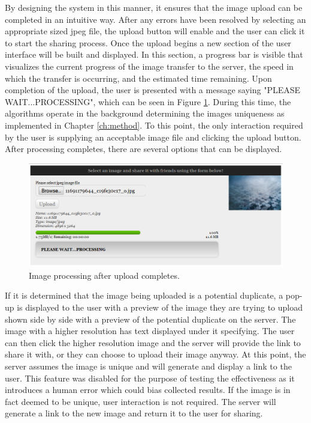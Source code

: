 By designing the system in this manner, it ensures that the image upload can be completed in an intuitive way. After any errors have been resolved by selecting an appropriate sized jpeg file, the upload button will enable and the user can click it to start the sharing process. Once the upload begins a new section of the user interface will be built and displayed. In this section, a progress bar is visible that visualizes the current progress of the image transfer to the server, the speed in which the transfer is occurring, and the estimated time remaining. Upon completion of the upload, the user is presented with a message saying "PLEASE WAIT...PROCESSING", which can be seen in Figure \ref{fig:imageprocessing}. During this time, the algorithms operate in the background determining the images uniqueness as implemented in Chapter \ref{ch:method}. To this point, the only interaction required by the user is supplying an acceptable image file and clicking the upload button. After processing completes, there are several options that can be displayed.

\begin{figure}[htbp]
\centering
\includegraphics[width=6in]{imageprocessing}
\caption{Image processing after upload completes.}
\label{fig:imageprocessing}
\end{figure}

If it is determined that the image being uploaded is a potential duplicate, a pop-up is displayed to the user with a preview of the image they are trying to upload shown side by side with a preview of the potential duplicate on the server. The image with a higher resolution has text displayed under it specifying. The user can then click the higher resolution image and the server will provide the link to share it with, or they can choose to upload their image anyway. At this point, the server assumes the image is unique and will generate and display a link to the user. This feature was disabled for the purpose of testing the effectiveness as it introduces a human error which could bias collected results. If the image is in fact deemed to be unique, user interaction is not required. The server will generate a link to the new image and return it to the user for sharing.

